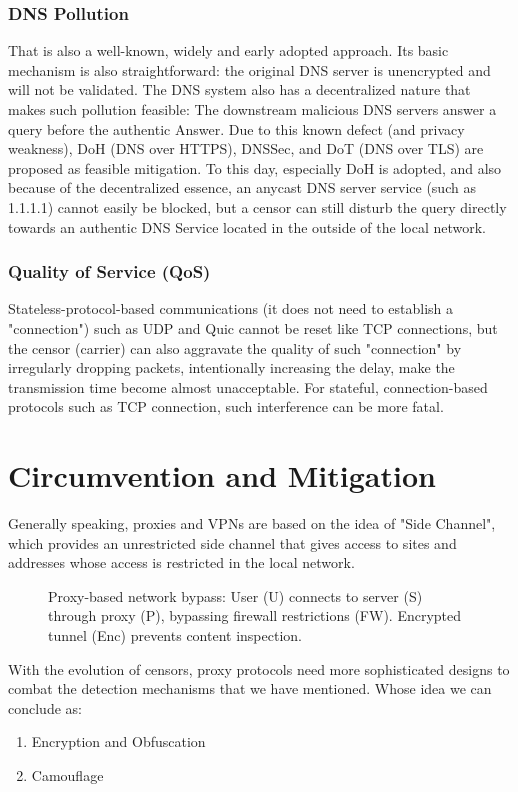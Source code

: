 \documentclass[conference]{IEEEtran}
\begin{document}
\subsubsection{DNS Pollution}
That is also a well-known, widely and early adopted approach. Its basic mechanism is also straightforward: the original DNS server is unencrypted and will not be validated. The DNS system also has a decentralized nature that makes such pollution feasible: The downstream malicious DNS servers answer a query before the authentic Answer.
Due to this known defect (and privacy weakness), DoH (DNS over HTTPS), DNSSec, and DoT (DNS over TLS)  are proposed as feasible mitigation. To this day, especially DoH is adopted, and also because of the decentralized essence, an anycast DNS server service (such as 1.1.1.1) cannot easily be blocked, but a censor can still disturb the query directly towards an authentic DNS Service located in the outside of the local network.

\subsubsection{Quality of Service (QoS)}
Stateless-protocol-based communications (it does not need to establish a "connection") such as UDP and Quic cannot be reset like TCP connections, but the censor (carrier) can also aggravate the quality of such "connection" by irregularly dropping packets, intentionally increasing the delay, make the transmission time become almost unacceptable.
For stateful, connection-based protocols such as TCP connection, such interference can be more fatal.

\section{Circumvention and Mitigation}
Generally speaking, proxies and VPNs are based on the idea of "Side Channel", which provides an unrestricted side channel that gives access to sites and addresses whose access is restricted in the local network.

\begin{figure}[!h]
\centering

\caption{Proxy-based network bypass: User (U) connects to server (S) through proxy (P), bypassing firewall restrictions (FW). Encrypted tunnel (Enc) prevents content inspection.}
\label{fig:proxy}
\end{figure}

With the evolution of censors, proxy protocols need more sophisticated designs to combat the detection mechanisms that we have mentioned. Whose idea we can conclude as:
\begin{enumerate}
    \item Encryption and Obfuscation
    \item Camouflage
\end{enumerate}
\end{document}
